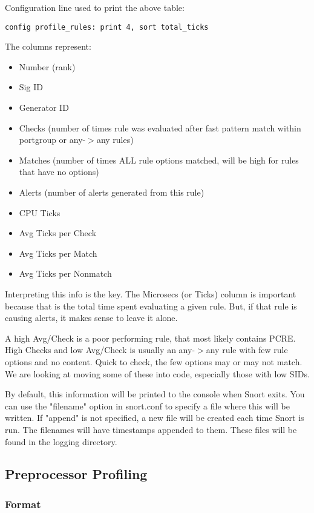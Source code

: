 \documentclass[english]{report}
\begin{document}
Configuration line used to print the above table: 

\subitem \texttt{config profile\_rules: print 4, sort total\_ticks}

The columns represent:

\begin{itemize}
\item Number (rank)
\item Sig ID
\item Generator ID
\item Checks (number of times rule was evaluated after fast pattern match
  within portgroup or any-$>$any rules)
\item Matches (number of times ALL rule options matched, will be high for
  rules that have no options)
\item Alerts (number of alerts generated from this rule)
\item CPU Ticks 
\item Avg Ticks per Check
\item Avg Ticks per Match
\item Avg Ticks per Nonmatch
\end{itemize}

Interpreting this info is the key.  The Microsecs (or Ticks) column is
important because that is the total time spent evaluating a given rule.  But,
if that rule is causing alerts, it makes sense to leave it alone.

A high Avg/Check is a poor performing rule, that most likely contains PCRE.
High Checks and low Avg/Check is usually an any-$>$any rule with few rule
options and no content.  Quick to check, the few options may or may not match.
We are looking at moving some of these into code, especially those with low
SIDs.

By default, this information will be printed to the console when Snort exits.
You can use the "filename" option in snort.conf to specify a file where this
will be written. If "append" is not specified, a new file will be created each
time Snort is run. The filenames will have timestamps appended to them. These
files will be found in the logging directory.

\subsection{Preprocessor Profiling}
\label{preproc profiling}

\subsubsection{Format}
\end{document}
